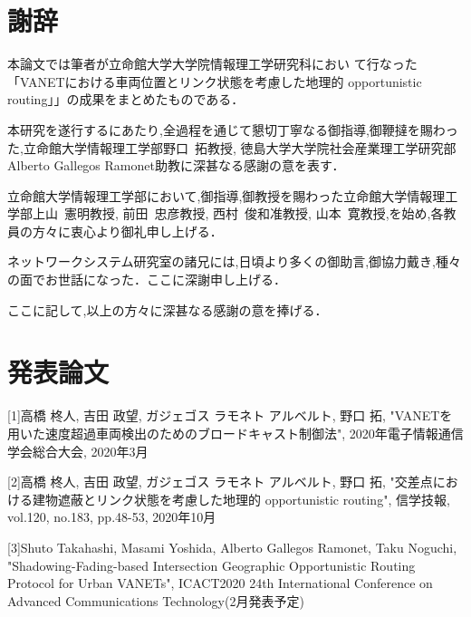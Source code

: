 \documentclass[10pt]{jreport}
\begin{document}
\chapter*{謝辞}
\sloppy 

本論文では筆者が立命館大学大学院情報理工学研究科におい
て行なった「VANETにおける車両位置とリンク状態を考慮した地理的
opportunistic routing」」の成果をまとめたものである．

本研究を遂行するにあたり,全過程を通じて懇切丁寧なる御指導,御鞭撻を賜わっ
た,立命館大学情報理工学部野口~拓教授, 徳島大学大学院社会産業理工学研究部Alberto Gallegos Ramonet助教に深甚なる感謝の意を表す．

立命館大学情報理工学部において,御指導,御教授を賜わった立命館大学情報理工学部上山~憲明教授, 前田~忠彦教授, 西村~俊和准教授, 山本~寛教授,を始め,各教員の方々に衷心より御礼申し上げる．

ネットワークシステム研究室の諸兄には,日頃より多くの御助言,御協力戴き,種々の面でお世話になった．ここに深謝申し上げる．

ここに記して,以上の方々に深甚なる感謝の意を捧げる．






\chapter*{発表論文}

[1]高橋 柊人, 吉田 政望, ガジェゴス ラモネト アルベルト, 野口 拓, "VANETを用いた速度超過車両検出のためのブロードキャスト制御法", 2020年電子情報通信学会総合大会, 2020年3月

[2]高橋 柊人, 吉田 政望, ガジェゴス ラモネト アルベルト, 野口 拓, "交差点における建物遮蔽とリンク状態を考慮した地理的 opportunistic routing", 信学技報, vol.120, no.183, pp.48-53, 2020年10月

[3]Shuto Takahashi, Masami Yoshida, Alberto Gallegos Ramonet, Taku Noguchi, "Shadowing-Fading-based Intersection Geographic Opportunistic Routing Protocol for Urban VANETs", ICACT2020 24th International Conference on Advanced Communications Technology(2月発表予定)
\end{document}
